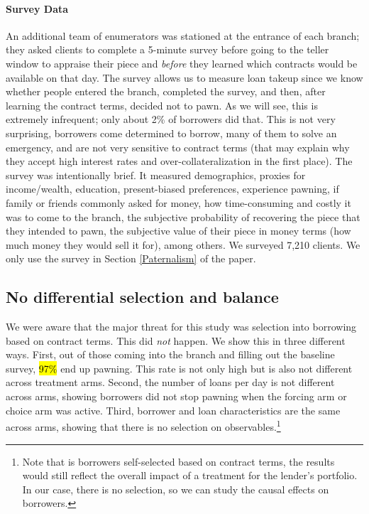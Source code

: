 \documentclass[12pt, a4paper]{article}
\begin{document}
\paragraph*{Survey Data} An additional team of enumerators was stationed at the entrance of each branch; they asked clients to complete a 5-minute survey before going to the teller window to appraise their piece and \textit{before} they learned which contracts would be available on that day. The survey allows us to measure loan takeup since we know whether people entered the branch, completed the survey, and then, after learning the contract terms, decided not to pawn. As we will see, this is extremely infrequent; only about 2\% of borrowers did that. This is not very surprising, borrowers come determined to borrow, many of them to solve an emergency, and are not very sensitive to contract terms (that may explain why they accept high interest rates and over-collateralization in the first place). The survey was intentionally brief. It measured demographics, proxies for income/wealth, education, present-biased preferences, experience pawning, if family or friends commonly asked for money, how time-consuming and costly it was to come to the branch, the subjective probability of recovering the piece that they intended to pawn, the subjective value of their piece in money terms (how much money they would sell it for), among others. We surveyed 7,210 clients. %
We only use the survey in Section \ref{Paternalism} of the paper.


\subsection{No differential selection and balance}
\label{sec:integrity}


We were aware that the major threat for this study was selection into borrowing based on contract terms. This did \textit{not} happen. We show this in three different ways. First, out of those coming into the branch and filling out the baseline survey, \hl{97\%} end up pawning. This rate is not only high but is also not different across treatment arms. Second, the number of loans per day is not different across arms, showing borrowers did not stop pawning when the forcing arm or choice arm was active.  Third, borrower and loan characteristics are the same across arms, showing that there is no selection on observables.\footnote{Note that is borrowers self-selected based on contract terms, the results would still reflect the overall impact of a treatment for the lender's portfolio. In our case, there is no selection, so we can study the causal effects on borrowers.} 
\end{document}
